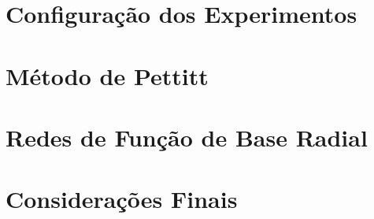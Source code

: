 \documentclass[qual, classic, a4paper]{ufbathesis}
\begin{document}
\section{Configuração dos Experimentos}
\blindtext

\section{Método de Pettitt}
\blindtext

\section{Redes de Função de Base Radial}
\blindtext

\section{Considerações Finais}
\blindtext


\backmatter





%
% 
% 

\end{document}
